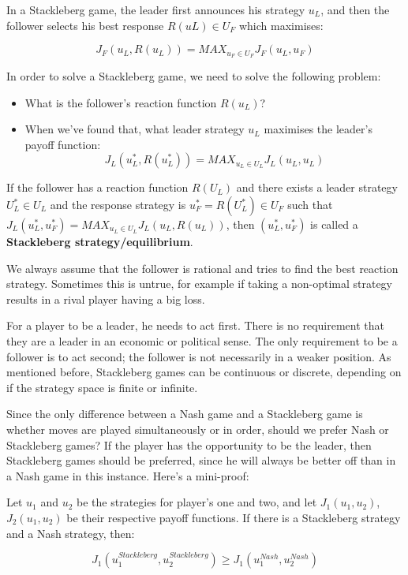 
In a Stackleberg game, the leader first announces his strategy $u_L$, and then
the follower selects his best response $R(uL) \in U_F$ which maximises:

\[
  J_F(u_L, R(u_L)) = MAX_{u_F \in U_F} J_F(u_L, u_F)
\]

In order to solve a Stackleberg game, we need to solve the following problem:

\begin{itemize}
  \item What is the follower's reaction function $R(u_L)$?
  \item When we've found that, what leader strategy $u_L$ maximises the leader's
  payoff function:
  \[
    J_L(u^*_L, R(u^*_L)) = MAX_{u_L \in U_L} J_L(u_L, u_L)
  \]
\end{itemize}

If the follower has a reaction function $R(U_L)$ and there exists a leader
strategy $U^*_L \in U_L$ and the response strategy is $u^*_F = R(U^*_L) \in U_F$
such that $J_L(u^*_L, u^*_F) = MAX_{u_L \in U_L} J_L(u_L, R(u_L))$, then
$(u^*_L, u^*_F)$ is called a \textbf{Stackleberg strategy/equilibrium}.

We always assume that the follower is rational and tries to find the best
reaction strategy. Sometimes this is untrue, for example if taking a non-optimal
strategy results in a rival player having a big loss.

For a player to be a leader, he needs to act first. There is no requirement that
they are a leader in an economic or political sense. The only requirement to be
a follower is to act second; the follower is not necessarily in a weaker
position. As mentioned before, Stackleberg games can be continuous or discrete,
depending on if the strategy space is finite or infinite.

Since the only difference between a Nash game and a Stackleberg game is whether
moves are played simultaneously or in order, should we prefer Nash or
Stackleberg games? If the player has the opportunity to be the leader, then
Stackleberg games should be preferred, since he will always be better off than in
a Nash game in this instance. Here's a mini-proof:

Let $u_1$ and $u_2$ be the strategies for player's one and two, and let
$J_1(u_1, u_2)$, $J_2(u_1, u_2)$ be their respective payoff functions. If there
is a Stackleberg strategy and a Nash strategy, then:

\[
  J_1(u^{Stackleberg}_1, u^{Stackleberg}_2) \geq J_1(u^{Nash}_1, u^{Nash}_2)
\]

